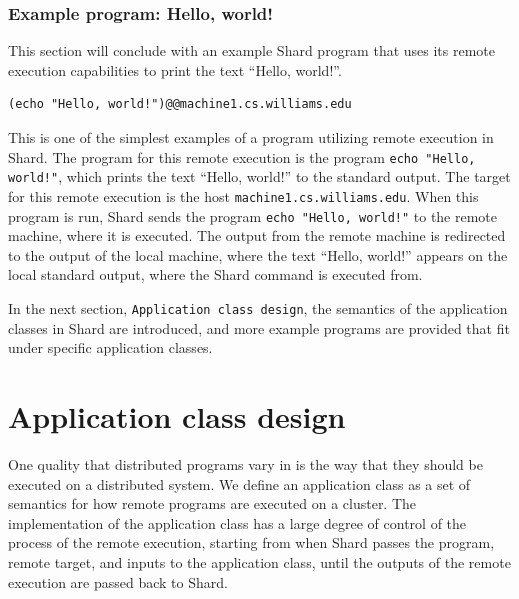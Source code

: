 \documentclass[twoside]{report}
\begin{document}
\subsubsection{Example program: Hello, world!}

This section will conclude with an example Shard program that uses its remote execution capabilities to print the text ``Hello, world!''.

\begin{lstlisting}[language=Shard]
(echo "Hello, world!")@@machine1.cs.williams.edu
\end{lstlisting}

This is one of the simplest examples of a program utilizing remote execution in Shard.
The program for this remote execution is the program \texttt{echo "Hello, world!"}, which prints the text ``Hello, world!'' to the standard output.
The target for this remote execution is the host \texttt{machine1.cs.williams.edu}.
When this program is run, Shard sends the program \texttt{echo "Hello, world!"} to the remote machine, where it is executed.
The output from the remote machine is redirected to the output of the local machine, where the text ``Hello, world!'' appears on the local standard output, where the Shard command is executed from.

In the next section, \texttt{Application class design}, the semantics of the application classes in Shard are introduced, and more example programs are provided that fit under specific application classes.

\section{Application class design}


One quality that distributed programs vary in is the way that they should be executed on a distributed system.
We define an application class as a set of semantics for how remote programs are executed on a cluster.
The implementation of the application class has a large degree of control of the process of the remote execution, starting from when Shard passes the program, remote target, and inputs to the application class, until the outputs of the remote execution are passed back to Shard.
\end{document}
